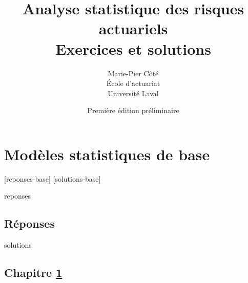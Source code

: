 \documentclass[letterpaper,11pt]{memoir}\usepackage[]{graphicx}\usepackage[]{color}
\title{\HUGE
    \fontseries{ub}\selectfont Analyse statistique des risques actuariels \\[0.5\baselineskip]
    \huge\fontseries{m}\selectfont Exercices et solutions}
\author{\LARGE Marie-Pier C\^ot\'e \\[3mm]
    \large École d'actuariat \\ Université Laval}
\date{Première édition préliminaire}
\newcounter{exercice}[chapter]
\begin{document}
\frontmatter

\pagestyle{empty}



\pagestyle{companion}


%

\cleardoublepage
\tableofcontents*

\mainmatter


%


\chapter{Modèles statistiques de base}
\label{chap:base}

[reponses-base]
[solutions-base]

\begin{Filesave}{reponses}
\bigskip
\section*{Réponses}

\end{Filesave}

\begin{Filesave}{solutions}
\section*{Chapitre \ref{chap:base}}

\end{Filesave}





\end{document}

